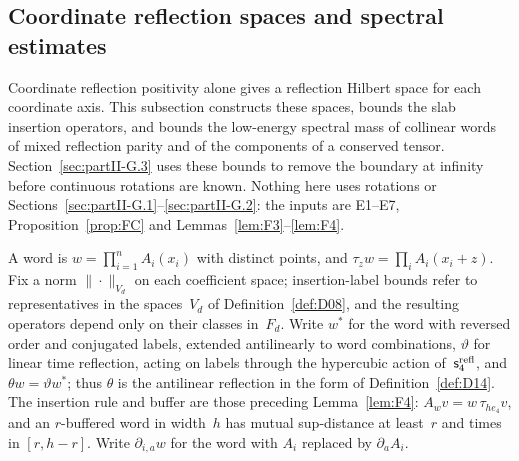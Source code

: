 \subsection{Coordinate reflection spaces and spectral estimates}\label{sec:G-coordinate}

Coordinate reflection positivity alone gives a reflection Hilbert space for each coordinate axis. This subsection constructs these spaces, bounds the slab insertion operators, and bounds the low-energy spectral mass of collinear words of mixed reflection parity and of the components of a conserved tensor. Section~\ref{sec:partII-G.3} uses these bounds to remove the boundary at infinity before continuous rotations are known. Nothing here uses rotations or Sections~\ref{sec:partII-G.1}--\ref{sec:partII-G.2}: the inputs are E1--E7, Proposition~\ref{prop:FC} and Lemmas~\ref{lem:F3}--\ref{lem:F4}.

A word is $w=\prod_{i=1}^n A_i(x_i)$ with distinct points, and $\tau_z w=\prod_i A_i(x_i+z)$. Fix a norm $\|\cdot\|_{V_d}$ on each coefficient space; insertion-label bounds refer to representatives in the spaces~$V_d$ of Definition~\ref{def:D08}, and the resulting operators depend only on their classes in~$F_d$. Write $w^*$ for the word with reversed order and conjugated labels, extended antilinearly to word combinations, $\vartheta$ for linear time reflection, acting on labels through the hypercubic action of~$\mathsf s_4^{\rm refl}$, and $\theta w=\vartheta w^*$; thus $\theta$ is the antilinear reflection in the form of Definition~\ref{def:D14}. The insertion rule and buffer are those preceding Lemma~\ref{lem:F4}: $A_wv=w\,\tau_{he_4}v$, and an $r$-buffered word in width~$h$ has mutual sup-distance at least~$r$ and times in $[r,h-r]$. Write $\partial_{i,a}w$ for the word with $A_i$ replaced by $\partial_aA_i$.

